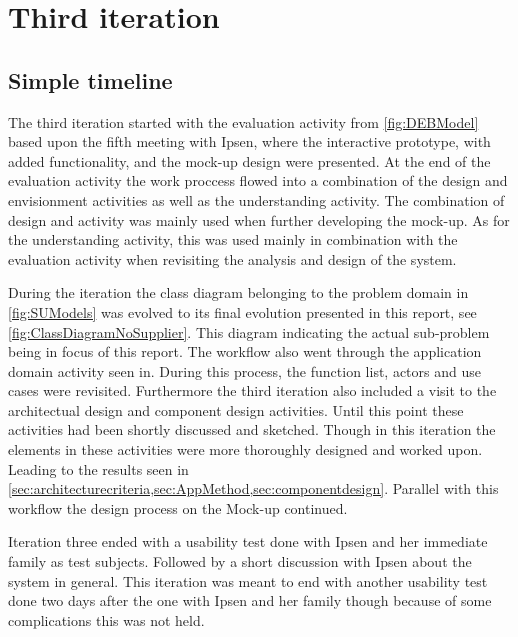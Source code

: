 \section{Third iteration}
\subsection{Simple timeline}\label{sec:3Iteration-timeline}
The third iteration started with the evaluation activity from \cref{fig:DEBModel} based upon the fifth meeting with Ipsen, where the interactive prototype, with added functionality, and the mock-up design were presented.
At the end of the evaluation activity the work proccess flowed into a combination of the design and envisionment activities as well as the understanding activity.
The combination of design and activity was mainly used when further developing the mock-up.
As for the understanding activity, this was used mainly in combination with the evaluation activity when revisiting the analysis and design of the system.

During the iteration the class diagram belonging to the problem domain in \cref{fig:SUModels} was evolved to its final evolution presented in this report, see \cref{fig:ClassDiagramNoSupplier}.
This diagram indicating the actual sub-problem being in focus of this report.
The workflow also went through the application domain activity seen in.
During this process, the function list, actors and use cases were revisited.
Furthermore the third iteration also included a visit to the architectual design and component design activities.
Until this point these activities had been shortly discussed and sketched.
Though in this iteration the elements in these activities were more thoroughly designed and worked upon.
Leading to the results seen in \cref{sec:architecturecriteria,sec:AppMethod,sec:componentdesign}.
Parallel with this workflow the design process on the Mock-up continued.

Iteration three ended with a usability test done with Ipsen and her immediate family as test subjects.
Followed by a short discussion with Ipsen about the system in general.
This iteration was meant to end with another usability test done two days after the one with Ipsen and her family though because of some complications this was not held.

